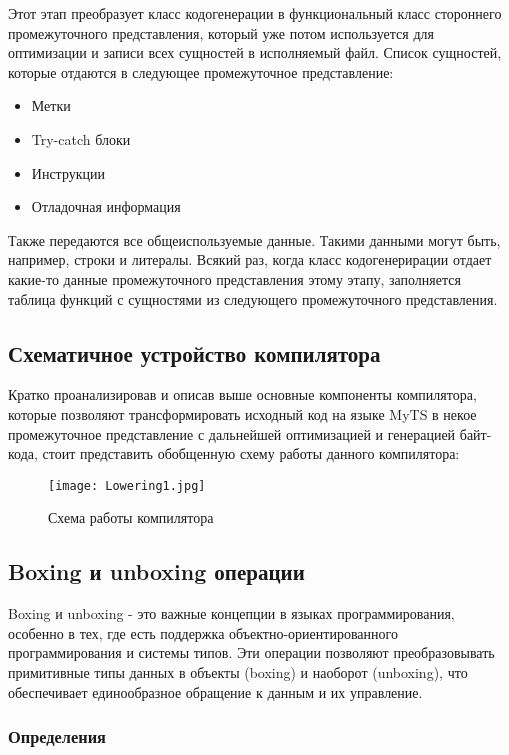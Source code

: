 Этот этап преобразует класс кодогенерации в функциональный класс стороннего промежуточного представления, который уже
потом используется для оптимизации и записи всех сущностей в исполняемый файл.
Список сущностей, которые отдаются в следующее промежуточное представление:

\begin{itemize}[left=2em]
    \item Метки
    \item Try-catch блоки
    \item Инструкции
    \item Отладочная информация
\end{itemize}

Также передаются все общеиспользуемые данные.
Такими данными могут быть, например, строки и литералы.
Всякий раз, когда класс кодогенерирации отдает какие-то данные промежуточного представления этому этапу,
заполняется таблица функций с сущностями из следующего промежуточного представления.

\subsection{Схематичное устройство компилятора}

Кратко проанализировав и описав выше основные компоненты компилятора, которые позволяют трансформировать исходный код на
языке MyTS в некое промежуточное представление с дальнейшей оптимизацией и генерацией байт-кода,
стоит представить обобщенную схему работы данного компилятора:

\begin{figure}[h]
    \centering
    \texttt{[image: Lowering1.jpg]}
    \caption{Схема работы компилятора}\label{fig:figure}
\end{figure}

\subsection{Boxing и unboxing операции}

Boxing и unboxing - это важные концепции в языках программирования, особенно в тех, где есть поддержка
объектно-ориентированного программирования и системы типов.
Эти операции позволяют преобразовывать примитивные типы данных в объекты (boxing) и наоборот (unboxing), что
обеспечивает единообразное обращение к данным и их управление.

\subsubsection{Определения}

